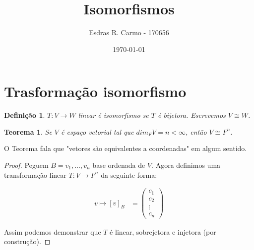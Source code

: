 \documentclass{article}
\author{Esdras R. Carmo - 170656}
\title{Isomorfismos}
\date{\today}
\newcommand{\deffunc}[3] {#1: #2 \longrightarrow #3}
\newtheorem{theorem}{Teorema}[section]
\newtheorem{definition}{Definição}[section]
\begin{document}
    \maketitle

    \section{Trasformação isomorfismo}
        \begin{definition}
            $\deffunc{T}{V}{W}$ linear é isomorfismo se $T$ é bijetora. Escrevemos
            $V \cong W$.
        \end{definition}

        \begin{theorem}
            Se $V$ é espaço vetorial tal que $\textit{dim}_F V = n < \infty$, então
            $V \cong F^n$.
        \end{theorem}
        O Teorema fala que "vetores são equivalentes a coordenadas" em algum sentido.
        \begin{proof}
            Peguem $B = {v_1, \dots, v_n}$ base ordenada de $V$.
            Agora definimos uma transformação linear $\deffunc{T}{V}{F^n}$ da seguinte
            forma: 
            
            \begin{align*}
                v \mapsto [v]_B &= \begin{pmatrix}c_1\\c_2\\\vdots\\c_n\end{pmatrix}
            \end{align*}

            Assim podemos demonstrar que $T$ é linear, sobrejetora e injetora (por construção).
        \end{proof}
\end{document}
